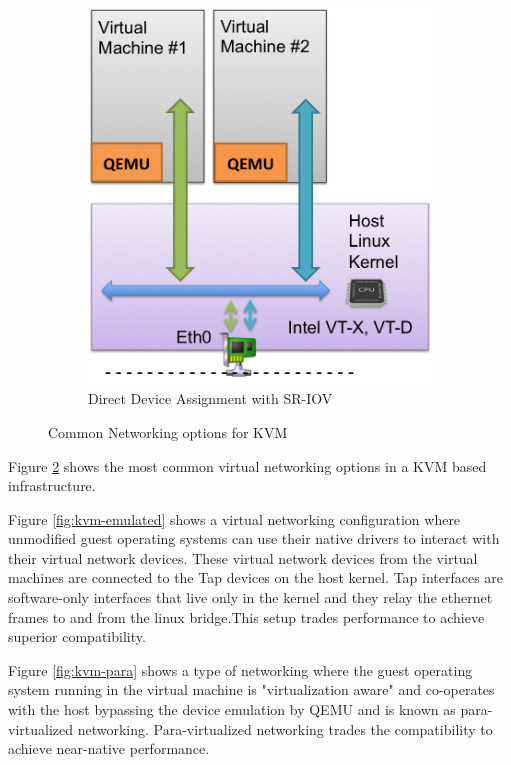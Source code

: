 \begin{enumerate}
\begin{figure}
\begin{subfigure}[b]{0.35\textwidth}
                \includegraphics[width=\textwidth]{kvm-direct-sriov.png}
                \caption{Direct Device Assignment with SR-IOV}
                \label{fig:kvm-direct-sriov}
        \end{subfigure}
        \caption{Common Networking options for KVM}\label{fig:kvm-networking}
\end{figure}


Figure \ref{fig:kvm-networking} shows the most common virtual networking options in a KVM based infrastructure.



Figure \ref{fig:kvm-emulated} shows a virtual networking configuration where unmodified guest operating systems can use their native drivers to interact with their virtual network devices. These virtual network devices from the virtual machines are connected to the Tap devices \cite{Tap_devices} on the host kernel. Tap interfaces are software-only interfaces that live only in the kernel and they relay the ethernet frames to and from the linux bridge.This setup trades performance to achieve superior compatibility.



Figure \ref{fig:kvm-para} shows a type of networking where the guest operating system running in the virtual machine is "virtualization aware" and co-operates with the host bypassing the device emulation by QEMU and is known as para-virtualized networking. Para-virtualized networking trades the compatibility to achieve near-native performance.




\end{enumerate}
